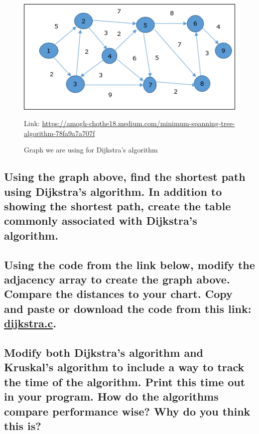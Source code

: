 \documentclass{article}
\begin{document}
\begin{figure}[!h]
\includegraphics[width=\linewidth]{dijkstragraph.jpg}
\caption{Graph we are using for Dijkstra's algorithm} Link: \href{https://amogh-chothe18.medium.com/minimum-spanning-tree-algorithm-78fa9a7a707f} {https://amogh-chothe18.medium.com/minimum-spanning-tree-algorithm-78fa9a7a707f}
\end{figure}

\subsection{Using the graph above, find the shortest path using Dijkstra's algorithm. In addition to showing the shortest path, create the table commonly associated with Dijkstra's algorithm.}

\pagebreak{}

\subsection{Using the code from the link below, modify the adjacency array to create the graph above. Compare the distances to your chart. Copy and paste or download the code from this link: \href{https://github.com/ehawkvu/ds-n-a/blob/master/graphing/dijkstra.c}{dijkstra.c}.}

\vspace{36pt}

\subsection{Modify both Dijkstra's algorithm and Kruskal's algorithm to include a way to track the time of the algorithm. Print this time out in your program. How do the algorithms compare performance wise? Why do you think this is?}
\end{document}
